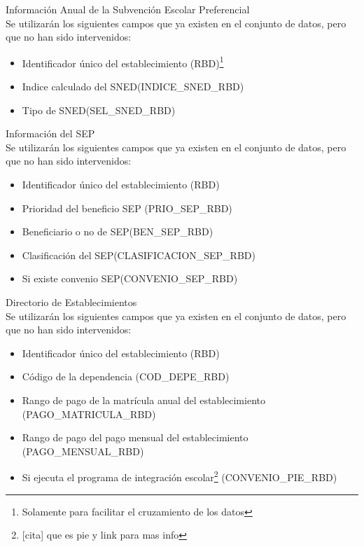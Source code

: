 \begin{longdescription}
        \item[Información Anual de la Subvención Escolar Preferencial] \hfill \\
         Se utilizarán los siguientes campos que ya existen en el conjunto de datos, pero que no han sido intervenidos:
            \begin{itemize}
                \item Identificador único del establecimiento (RBD)\footnote{Solamente para facilitar el cruzamiento de los datos}
                \item Indice calculado del SNED(INDICE\_SNED\_RBD)
                \item Tipo de SNED(SEL\_SNED\_RBD)
            \end{itemize}
        \item[Información del SEP] \hfill \\
        Se utilizarán los siguientes campos que ya existen en el conjunto de datos, pero que no han sido intervenidos:
            \begin{itemize}
              \item Identificador único del establecimiento (RBD)
              \item Prioridad del beneficio SEP (PRIO\_SEP\_RBD)
              \item Beneficiario o no de SEP(BEN\_SEP\_RBD)
              \item Clasificación del SEP(CLASIFICACION\_SEP\_RBD)
              \item Si existe convenio SEP(CONVENIO\_SEP\_RBD)
            \end{itemize}
        \item[Directorio de Establecimientos] \hfill \\
            Se utilizarán los siguientes campos que ya existen en el conjunto de datos, pero que no han sido intervenidos:
            \begin{itemize}
              \item Identificador único del establecimiento (RBD)
              \item Código de la dependencia (COD\_DEPE\_RBD)
              \item Rango de pago de la matrícula anual del establecimiento (PAGO\_MATRICULA\_RBD)
              \item Rango de pago del pago mensual del establecimiento (PAGO\_MENSUAL\_RBD)
              \item Si ejecuta el programa de integración escolar\footnote{[cita] que es pie y link para mas info} (CONVENIO\_PIE\_RBD)

\end{itemize}
\end{longdescription}
